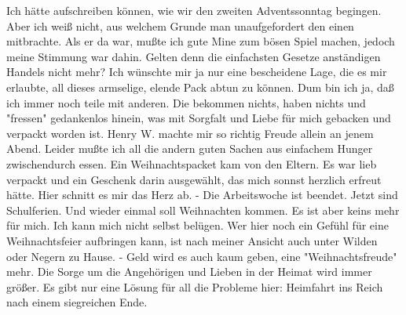 \def\day{21. Dezember 1943.}
\mktitle

Ich h\"{a}tte aufschreiben k\"{o}nnen, wie wir den zweiten Adventssonntag begingen.
Aber ich wei{\ss} nicht, aus welchem Grunde man unaufgefordert den einen mitbrachte.
Als er da war, mu{\ss}te ich gute Mine zum b\"{o}sen Spiel machen, jedoch meine Stimmung war dahin.
Gelten denn die einfachsten Gesetze anst\"{a}ndigen Handels nicht mehr?
Ich w\"{u}nschte mir ja nur eine bescheidene Lage, die es mir erlaubte, all dieses armselige, elende Pack abtun zu k\"{o}nnen.
Dum bin ich ja, da{\ss} ich immer noch teile mit anderen.
Die bekommen nichts, haben nichts und "fressen" gedankenlos hinein, was mit Sorgfalt und Liebe f\"{u}r mich gebacken und verpackt worden ist.
Henry W. machte mir so richtig Freude allein an jenem Abend.
Leider mu{\ss}te ich all die andern guten Sachen aus einfachem Hunger zwischendurch essen.
Ein Weihnachtspacket kam von den Eltern.
Es war lieb verpackt und ein Geschenk darin ausgew\"{a}hlt, das mich sonnst herzlich erfreut h\"{a}tte.
Hier schnitt es mir das Herz ab.
- Die Arbeitswoche ist beendet.
Jetzt sind Schulferien.
Und wieder einmal soll Weihnachten kommen.
Es ist aber keins mehr f\"{u}r mich.
Ich kann mich nicht selbst bel\"{u}gen.
Wer hier noch ein Gef\"{u}hl f\"{u}r eine Weihnachtsfeier aufbringen kann, ist nach meiner Ansicht auch unter Wilden oder Negern zu Hause.
- Geld wird es auch kaum geben, eine "Weihnachtsfreude" mehr.
Die Sorge um die Angeh\"{o}rigen und Lieben in der Heimat wird immer gr\"{o}{\ss}er.
Es gibt nur eine L\"{o}sung f\"{u}r all die Probleme hier: Heimfahrt ins Reich nach einem siegreichen Ende.

\clearpage
